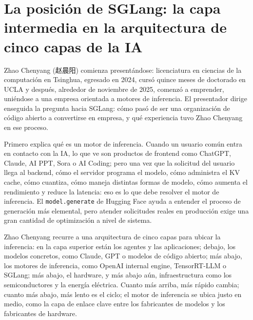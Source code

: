 \documentclass[a4paper]{article}
\begin{document}
\section{La posición de SGLang: la capa intermedia en la arquitectura de cinco capas de la IA}

Zhao Chenyang (赵晨阳) comienza presentándose: licenciatura en ciencias de la computación en Tsinghua, egresado en 2024, cursó quince meses de doctorado en UCLA y después, alrededor de noviembre de 2025, comenzó a emprender, uniéndose a una empresa orientada a motores de inferencia. El presentador dirige enseguida la pregunta hacia SGLang: cómo pasó de ser una organización de código abierto a convertirse en empresa, y qué experiencia tuvo Zhao Chenyang en ese proceso.

Primero explica qué es un motor de inferencia. Cuando un usuario común entra en contacto con la IA, lo que ve son productos de frontend como ChatGPT, Claude, AI PPT, Sora o AI Coding; pero una vez que la solicitud del usuario llega al backend, cómo el servidor programa el modelo, cómo administra el KV cache, cómo cuantiza, cómo maneja distintas formas de modelo, cómo aumenta el rendimiento y reduce la latencia: eso es lo que debe resolver el motor de inferencia. El \texttt{model.generate} de Hugging Face ayuda a entender el proceso de generación más elemental, pero atender solicitudes reales en producción exige una gran cantidad de optimización a nivel de sistema.

Zhao Chenyang recurre a una arquitectura de cinco capas para ubicar la inferencia: en la capa superior están los agentes y las aplicaciones; debajo, los modelos concretos, como Claude, GPT o modelos de código abierto; más abajo, los motores de inferencia, como OpenAI internal engine, TensorRT-LLM o SGLang; más abajo, el hardware, y más abajo aún, infraestructura como los semiconductores y la energía eléctrica. Cuanto más arriba, más rápido cambia; cuanto más abajo, más lento es el ciclo; el motor de inferencia se ubica justo en medio, como la capa de enlace clave entre los fabricantes de modelos y los fabricantes de hardware.
\end{document}

